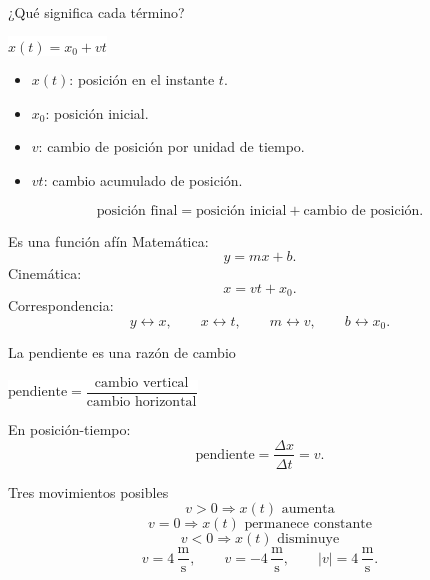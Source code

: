 \documentclass[aspectratio=169,11pt]{beamer}
\newcommand{\caja}[1]{%
  \begin{center}
  \setlength{\fboxsep}{9pt}
  \colorbox{white}{\(\displaystyle \boxed{#1}\)}
  \end{center}
}
\begin{document}
\begin{frame}{¿Qué significa cada término?}
  \caja{x(t)=x_0+vt}
  \begin{itemize}
    \item \(x(t)\): posición en el instante \(t\).
    \item \(x_0\): posición inicial.
    \item \(v\): cambio de posición por unidad de tiempo.
    \item \(vt\): cambio acumulado de posición.
  \end{itemize}
  \[
    \text{posición final}
    =
    \text{posición inicial}
    +
    \text{cambio de posición}.
  \]
\end{frame}

\begin{frame}{Es una función afín}
  Matemática:
  \[
    y=mx+b.
  \]
  Cinemática:
  \[
    x=vt+x_0.
  \]
  Correspondencia:
  \[
    y\leftrightarrow x,
    \qquad
    x\leftrightarrow t,
    \qquad
    m\leftrightarrow v,
    \qquad
    b\leftrightarrow x_0.
  \]
\end{frame}

\begin{frame}{La pendiente es una razón de cambio}
  \caja{\text{pendiente}=\dfrac{\text{cambio vertical}}{\text{cambio horizontal}}}
  En posición-tiempo:
  \[
    \text{pendiente}
    =
    \frac{\Delta x}{\Delta t}
    =
    v.
  \]
  \begin{center}
  \end{center}
\end{frame}

\begin{frame}{Tres movimientos posibles}
  \[
    v>0\Rightarrow x(t)\text{ aumenta}
  \]
  \[
    v=0\Rightarrow x(t)\text{ permanece constante}
  \]
  \[
    v<0\Rightarrow x(t)\text{ disminuye}
  \]
  \[
    v=4\,\frac{\mathrm{m}}{\mathrm{s}},
    \qquad
    v=-4\,\frac{\mathrm{m}}{\mathrm{s}},
    \qquad
    |v|=4\,\frac{\mathrm{m}}{\mathrm{s}}.
  \]
\end{frame}
\end{document}

